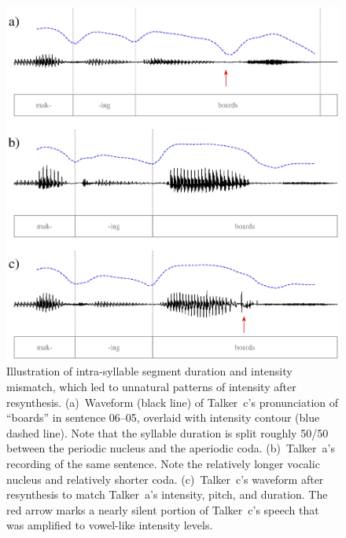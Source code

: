 \begin{figure}
	\begin{centering}
	\includegraphics{figures/segmentMismatch/segmentMismatch.eps}
	\caption[Segment duration mismatch in resynthesis]{Illustration of intra-syllable segment duration and intensity mismatch, which led to unnatural patterns of intensity after resynthesis.  (a)~Waveform (black line) of Talker~\ac{c}’s pronunciation of “boards” in sentence 06–05, overlaid with intensity contour (blue dashed line).  Note that the syllable duration is split roughly 50/50 between the periodic nucleus and the aperiodic coda.  (b)~Talker~\ac{a}’s recording of the same sentence.  Note the relatively longer vocalic nucleus and relatively shorter coda.  (c)~Talker~\ac{c}’s waveform after resynthesis to match Talker~\ac{a}’s intensity, pitch, and duration.  The red arrow marks a nearly silent portion of Talker~\ac{c}’s speech that was amplified to vowel-like intensity levels.\label{fig:SegDurMismatch}}
	\end{centering}
\end{figure}

